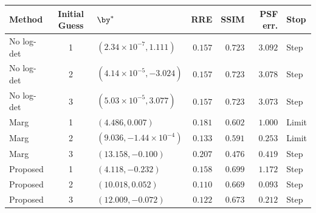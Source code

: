 \begin{tabular}{@{}lclrrrl@{}}
\toprule
Method & Initial Guess & $\by^*$ & RRE & SSIM & PSF err. & Stop \\
\midrule
No log-det & 1 & $(2.34\times10^{-7},1.111)$ & $0.157$ & $\mathbf{0.723}$ & $3.092$ & Step \\
No log-det & 2 & $(4.14\times10^{-5},-3.024)$ & $0.157$ & $\mathbf{0.723}$ & $3.078$ & Step \\
No log-det & 3 & $(5.03\times10^{-5},3.077)$ & $0.157$ & $\mathbf{0.723}$ & $3.073$ & Step \\
\addlinespace[3pt]
Marg & 1 & $(4.486,0.007)$ & $0.181$ & $0.602$ & $1.000$ & Limit \\
Marg & 2 & $(9.036,-1.44\times10^{-4})$ & $0.133$ & $0.591$ & $0.253$ & Limit \\
Marg & 3 & $(13.158,-0.100)$ & $0.207$ & $0.476$ & $0.419$ & Step \\
\addlinespace[3pt]
Proposed & 1 & $(4.118,-0.232)$ & $0.158$ & $0.699$ & $1.172$ & Step \\
Proposed & 2 & $(10.018,0.052)$ & $\mathbf{0.110}$ & $0.669$ & $\mathbf{0.093}$ & Step \\
Proposed & 3 & $(12.009,-0.072)$ & $0.122$ & $0.673$ & $0.212$ & Step \\
\bottomrule
\end{tabular}
